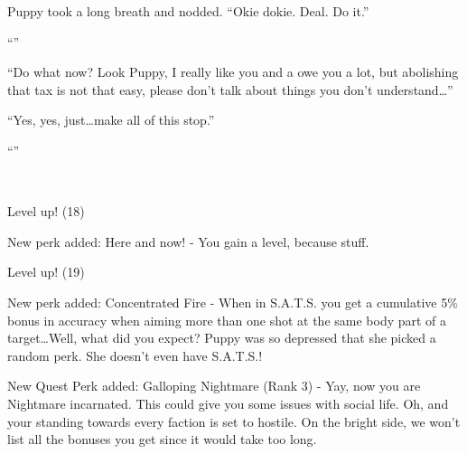 Puppy took a long breath and nodded. ``Okie dokie. Deal. Do it.''

``''

``Do what now? Look Puppy, I really like you and a owe you a lot, but abolishing that tax is not that easy, please don't talk about things you don't understand\dots''

``Yes, yes, just\dots make all of this stop.''

``''

\clearpage

~\vfill

\begin{engnote}
    Level up! (18)
    
    New perk added: Here and now! - You gain a level, because stuff.
\end{engnote}

\bigskip
    
\begin{engnote}
    Level up! (19)
    
    New perk added: Concentrated Fire - When in S.A.T.S. you get a cumulative 5\% bonus in accuracy when aiming more than one shot at the same body part of a target\dots Well, what did you expect? Puppy was so depressed that she picked a random perk. She doesn't even have S.A.T.S.!
    
    New Quest Perk added: Galloping Nightmare (Rank 3) - Yay, now you are Nightmare incarnated. This could give you some issues with social life. Oh, and your standing towards every faction is set to hostile. On the bright side, we won't list all the bonuses you get since it would take too long.
\end{engnote}


